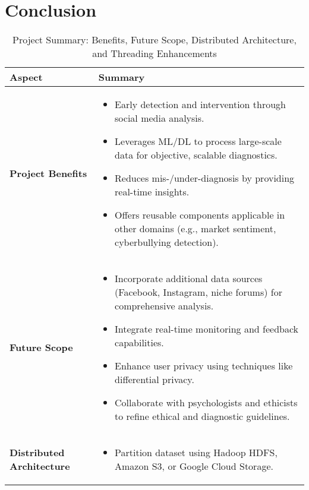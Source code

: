 
\section{Conclusion}

\begin{table}[H]
    \caption*{Project Summary: Benefits, Future Scope, Distributed Architecture, and Threading Enhancements}
    \label{tab:project_summary}
    \begin{tabularx}{\textwidth}{|>{\raggedright\arraybackslash}p{3cm}|X|}
    \hline
    \textbf{Aspect} & \textbf{Summary} \\ \hline
    \textbf{Project Benefits} & 
    \begin{itemize}[noitemsep, leftmargin=*, topsep=0pt]
        \item Early detection and intervention through social media analysis.
        \item Leverages ML/DL to process large-scale data for objective, scalable diagnostics.
        \item Reduces mis-/under-diagnosis by providing real-time insights.
        \item Offers reusable components applicable in other domains (e.g., market sentiment, cyberbullying detection).
    \end{itemize} \\ \hline
    \textbf{Future Scope} & 
    \begin{itemize}[noitemsep, leftmargin=*, topsep=0pt]
        \item Incorporate additional data sources (Facebook, Instagram, niche forums) for comprehensive analysis.
        \item Integrate real-time monitoring and feedback capabilities.
        \item Enhance user privacy using techniques like differential privacy.
        \item Collaborate with psychologists and ethicists to refine ethical and diagnostic guidelines.
    \end{itemize} \\ \hline
    \textbf{Distributed Architecture} & 
    \begin{itemize}[noitemsep, leftmargin=*, topsep=0pt]
        \item Partition dataset using Hadoop HDFS, Amazon S3, or Google Cloud Storage.

\end{itemize}
\end{tabularx}
\end{table}
